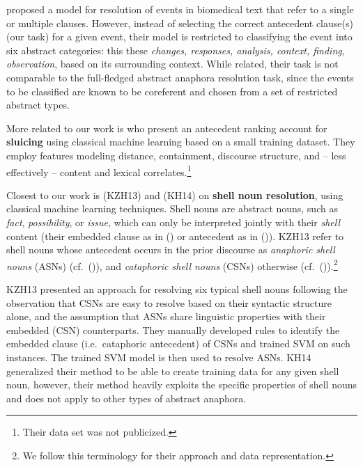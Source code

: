 \documentclass[11pt,letterpaper]{article}
\begin{document}
\citet{rajagopal2016unsupervised} proposed a model for resolution of events in biomedical text that refer to a single or multiple clauses.
However, instead of selecting the correct antecedent clause(s) (our task) for a given event, their model is restricted to classifying the event into six abstract categories: this these \textit{changes, responses, analysis, context, finding, observation}, based on its surrounding context. While related, their task is not comparable to the full-fledged abstract anaphora resolution task, since the events to be classified are known to be coreferent and chosen from a set of restricted abstract types.

More related to our work is \citet{anand-hardt:2016:EMNLP2016} who present an antecedent ranking account for {\bf sluicing} using classical machine learning based on a small training dataset. They employ features modeling distance, containment, discourse structure, and -- less effectively -- content and lexical correlates.\footnote{Their data set was not publicized.} 

Closest to our work is \citet{kolhatkar-zinsmeister-hirst:2013:EMNLP} (KZH13) and \citet{kolhatkar-hirst:2014:EMNLP2014} (KH14) on \textbf{shell noun resolution}, using classical machine learning techniques.
Shell nouns are abstract nouns, such as \textit{fact}, \textit{possibility}, or \textit{issue}, which can only be interpreted 
jointly 
with their \textit{shell} content (their embedded clause as in () or antecedent as in ()). 
KZH13 refer to shell nouns whose antecedent occurs in the prior discourse as \textit{anaphoric shell nouns} (ASNs) (cf.\ ()), and {\em cataphoric shell nouns} (CSNs) otherwise (cf.\ ()).\footnote{We follow this terminology for their approach and data representation.} 





KZH13 presented an approach for resolving six typical shell nouns following the observation that 
CSNs are easy to resolve based on their syntactic structure alone, and the assumption that ASNs share linguistic properties with their embedded (CSN) counterparts.
They manually developed rules to identify the embedded clause (i.e.\ cataphoric antecedent) of CSNs and trained SVM \cite{joachims2002optimizing} on such instances.
The trained SVM model is then used to resolve ASNs.  KH14 generalized their method to be able 
to create training data for any given shell noun, 
however, their method heavily exploits the specific properties of shell nouns and does not apply to other types of abstract anaphora. 
\end{document}
